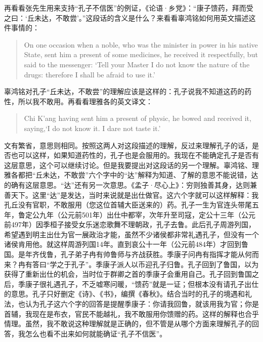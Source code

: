 再看看张先生用来支持“孔子不信医”的例证，《论语·乡党》：“康子馈药，拜而受之曰：‘丘未达，不敢尝’。”这段话的含义是什么？来看看辜鸿铭如何用英文描述这件事情的：
\begin{quote}
On one occasion when a noble, who was the minister in power in his native State, sent him a present of some medicines, he received it respectfully, but said to the messenger: `Tell your Master I do not know the nature of the drugs: therefore I shall be afraid to use it.' 
\end{quote}
辜鸿铭对孔子“丘未达，不敢尝”的理解应该是这样的：孔子说我不知道这药的药性，所以我不敢用。再看看理雅各的英文译文：
\begin{quote}
Chi K'ang having sent him a present of physic, he bowed and received it, saying,`I do not know it. I dare not taste it.'
\end{quote}
文有繁省，意思则相同。按照这两人对这段描述的理解，反过来理解孔子的话，是否也可以这样，如果知道药性的，孔子也是会服用的。我现在不能确定孔子是否有这层意思，这个可以继续讨论。但是我要提出对这段话的另一个理解。辜鸿铭、理雅各都把“丘未达，不敢尝”六个字中的“达”解释为知道、了解的意思不能说错，达的确有这层意思。“达”还有另一次意思。《孟子·尽心上》：穷则独善其身，达则兼善天下。这里“达”是发达，当时来说就是出仕做官。这六个字就可以这样解释：我孔丘没有官职，不敢服用（您这位首辅大臣送来的）药。孔子一生为官连头带尾五年，鲁定公九年（公元前501年）出仕中都宰，次年升至司寇，定公十三年（公元前497年）因季桓子接受女乐迷恋歌舞不理朝政，孔子去鲁。此后孔子周游列国，希望遇到明主出仕为官一展政治才能，虽然不少诸侯都非常礼遇孔子，但没有一个诸侯肯用他。就这样周游列国14年。直到哀公十一年（公元前484年）才回到鲁国。是年齐伐鲁，孔子弟子冉有帅鲁师与齐战获胜。季康子问冉有指挥才能从何而来？冉有答曰“学之于孔子”。季康子派人以币迎孔子归鲁。孔子回到了鲁国，以为获得了重新出仕的机会，当时位于群卿之首的季康子会重用自己。孔子回到鲁国之后，季康子很礼遇孔子，不乏嘘寒问暖，“馈药”就是一证；但根本没有请孔子出仕的意思。孔子只好删定《诗》、《书》，编撰《春秋》。结合当时的孔子的境遇和礼法，也认为孔子这六个字的回答是提醒季康子：你请我回鲁，就该用我为官；你是首辅，我现在是布衣，官民不能越礼，我不敢服用你馈赠的药。这样的解释也合乎情理。虽然，我不敢说这种理解就是正确的，但不管是从哪个方面来理解孔子的回答，我怎么也看不出来如何就能确证“孔子不信医”。

